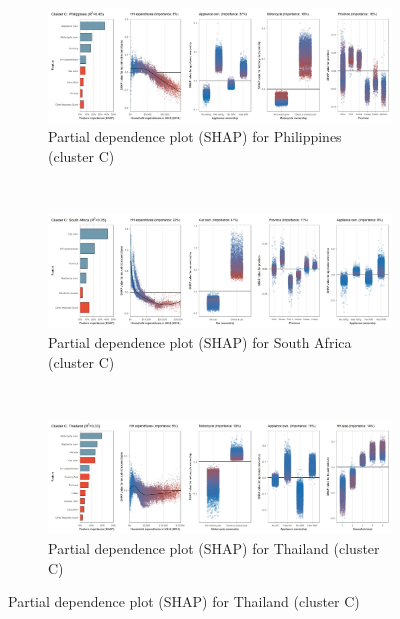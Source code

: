 \begin{figure}[ht!]\ContinuedFloat
    \centering
   \begin{subfigure}[b]{\textwidth}
         \centering
         \caption{Partial dependence plot (SHAP) for Philippines (cluster C)}
         \label{fig:5b_PHL}
         \includegraphics[width=\textwidth]{Figure 5b/Figure_5b_PHL}         
     \end{subfigure}
    \\
    \vspace{0.5cm}
   \begin{subfigure}[b]{\textwidth}
         \centering
         \caption{Partial dependence plot (SHAP) for South Africa (cluster C)}
         \label{fig:5b_ZAF}
         \includegraphics[width=\textwidth]{Figure 5b/Figure_5b_ZAF}         
     \end{subfigure}
    \\
    \vspace{0.5cm}
   \begin{subfigure}[b]{\textwidth}
         \centering
         \caption{Partial dependence plot (SHAP) for Thailand (cluster C)}
         \label{fig:5b_THA}
         \includegraphics[width=\textwidth]{Figure 5b/Figure_5b_THA}

\end{subfigure}
\end{figure}
